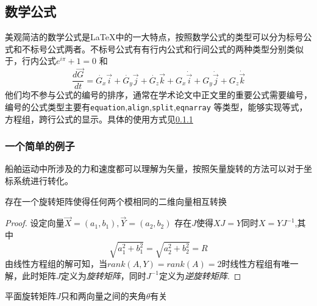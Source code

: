 \subsection{数学公式}
美观简洁的数学公式是\LaTeX 中的一大特点，按照数学公式的类型可以分为标号公式和不标号公式两者。不标号公式有有行内公式和行间公式的两种类型分别类似于，行内公式$ e^{i\pi}+1=0 $ 和\[ \dfrac{d\vec{G}}{dt}=\dot{G_x}\vec{i}+\dot{G_y}\vec{j}+\dot{G_z}\vec{k}+G_x\dot{\vec{i}}+G_y\dot{\vec{j}}+G_z\dot{\vec{k}} \]
他们均不参与公式的编号的排序，通常在学术论文中正文里的重要公式需要编号，编号的公式类型主要有\verb|equation|,\verb|align|,\verb|split|,\verb|eqnarray| 等类型，能够实现等式，方程组，跨行公式的显示。具体的使用方式见\ref{example}
\subsubsection{一个简单的例子}\label{example}
船舶运动中所涉及的力和速度都可以理解为矢量，按照矢量旋转的方法可以对于坐标系统进行转化。
\begin{lemma}
\label{2Drot} 
存在一个旋转矩阵使得任何两个模相同的二维向量相互转换
\end{lemma}
\begin{proof}
设定向量$\vec{X}=(a_1,b_1),\vec{Y}=(a_2,b_2)$ 存在$ J $使得$ XJ=Y $同时$X=YJ^{-1}$,其中\[  \sqrt{a_1^{2}+b_1^{2}}=\sqrt{a_2^{2}+b_2^{2}}=R \] 
由线性方程组的解可知，当$rank(A,Y)=rank(A)=2$时线性方程组有唯一解，此时矩阵$ J $定义为\textit{旋转矩阵}，同时$ J^{-1} $定义为\textit{逆旋转矩阵}.
\end{proof}
\begin{theorem}
\label{rotM}
平面旋转矩阵$ J $只和两向量之间的夹角$ \theta $有关
\end{theorem}

